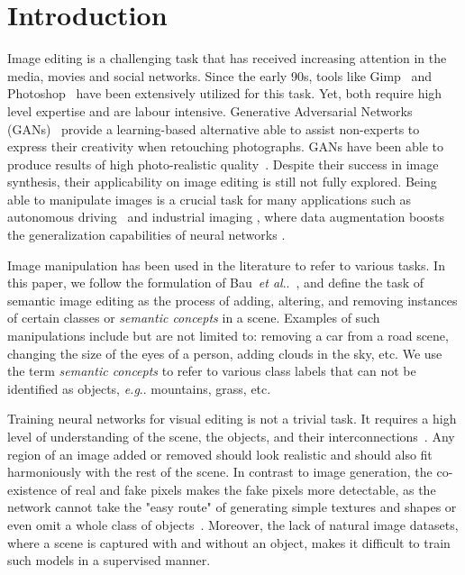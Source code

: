 \documentclass[runningheads]{llncs}
\makeatletter
\DeclareRobustCommand\onedot{\futurelet\@let@token\@onedot}
\def\@onedot{\ifx\@let@token.\else.\null\fi\xspace}
\def\eg{\emph{e.g}\onedot} \def\Eg{\emph{E.g}\onedot}
\def\etal{\emph{et al}\onedot}
\makeatother
\begin{document}
\section{Introduction}
\label{sec:introduction}

Image editing is a challenging task that has received increasing attention in the media, movies and social networks.
Since the early 90s, tools like Gimp~\cite{GIMP:2018} and Photoshop~\cite{Photoshop:2020} have been extensively utilized for this task.
Yet, both require high level expertise and are labour intensive.
Generative Adversarial Networks (GANs)~\cite{goodfellowGAN} provide a learning-based alternative able to assist non-experts to express their creativity when retouching photographs.
GANs have been able to produce results of high photo-realistic quality~\cite{karras2018progressive,Karras_2019_CVPR}. Despite their success in image synthesis, their applicability on image editing is still not fully explored.
Being able to manipulate images is a crucial task for many applications such as autonomous driving~\cite{janai2017computer} and industrial imaging \cite{vidi}, where data augmentation boosts the generalization capabilities of  neural networks \cite{antoniou2017data,Wang_2018,Frid_Adar_2018}.

Image manipulation has been used in the literature to refer to various tasks.
In this paper, we follow the formulation of Bau~\etal~\cite{Bau_Ganpaint_2019}, and define the task of semantic image editing as the process of adding, altering, and removing instances of certain classes or \emph{semantic concepts} in a scene.
Examples of such manipulations include but are not limited to: removing a car from a road scene, changing the size of the eyes of a person, adding clouds in the sky, etc.
We use the term \emph{semantic concepts} to refer to various class labels that can not be identified as objects, \eg{} mountains, grass, etc.

Training neural networks for visual editing is not a trivial task.
It requires a high level of understanding of the scene, the objects, and their interconnections~\cite{shetty2018context}.
Any region of an image added or removed should look realistic and should also fit harmoniously with the rest of the scene.
In contrast to image generation, the co-existence of real and fake pixels makes the fake pixels more detectable, as the network cannot take the "easy route" of generating simple textures and shapes or even omit a whole class of objects~\cite{bau2019seeing}.
Moreover, the lack of natural image datasets, where a scene is captured with and without an object, makes it difficult to train such models in a supervised manner.
\end{document}
